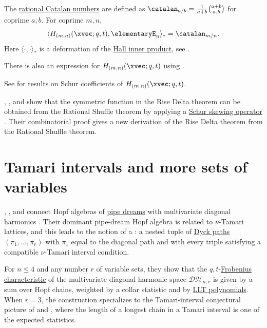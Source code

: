 The \hyperref[prelimQanalogsCatalan]{rational Catalan numbers}
are defined as $\catalan_{a/b} = \frac{1}{a+b}\binom{a+b}{a,b}$ for coprime $a,b$.
For coprime $m,n$,
\[
 \langle H_{(m,n)}(\xvec;q,t), \elementaryE_n \rangle_* = \catalan_{m/n}.
\]
Here $\langle \cdot, \cdot \rangle_*$ is a deformation of the
\hyperref[hallInnerProduct]{Hall inner product}, see
\cite[Eq.~(4.6) and Eq.~(6.29)]{BergeronGarsiaLevenXin2015}.

There is also an expression for $H_{(m,n)}(\xvec;q,t)$ using
\label{teslerMatrix}.


See \cite{QiuRemmel2018x} for results
on Schur coefficients of $H_{(m,n)}(\xvec;q,t)$.

, , and 
show that the symmetric function in the Rise Delta theorem can be obtained
from the Rational Shuffle theorem by applying a
\hyperref[schurSkew]{Schur skewing operator}
\cite{GillespieGorskyGriffin2024x}.  Their combinatorial proof gives a new
derivation of the Rise Delta theorem from the Rational Shuffle theorem.



\section[tamariInterval]{Tamari intervals and more sets of variables}

, , and 
connect Hopf algebras of \hyperref[pipeDream]{pipe dreams} with multivariate diagonal harmonics
\cite[Sec.~8]{BergeronCeballosPilaud2018x}.  Their dominant pipe-dream Hopf
algebra is related to $\nu$-Tamari lattices, and this leads to the notion of a
\label{hopfChain}: a nested tuple of
\hyperref[qtCatalan]{Dyck paths}
$(\pi_1,\dotsc,\pi_r)$ with $\pi_1$ equal to the diagonal path and with every
triple satisfying a compatible $\nu$-Tamari interval condition.

For $n\leq 4$ and any number $r$ of variable sets, they show that the
$q,t$-\hyperref[frobeniusCharacteristic]{Frobenius characteristic} of the multivariate diagonal harmonic space
$\mathcal{DH}_{n,r}$ is given by a sum over Hopf chains, weighted by a collar
statistic and by \hyperref[LLT]{LLT polynomials}.  When $r=3$, the construction specializes to
the Tamari-interval conjectural picture of  and
, where
the length of a longest chain in a Tamari interval is one of the expected
statistics.



